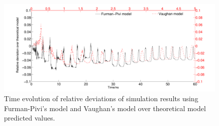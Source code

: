 \documentclass[a4paper,11pt]{article}
\begin{document}
\begin{figure}[H]
\begin{center}
\includegraphics[width=1\textwidth]{models_comp.pdf}
\end{center}
\caption{Time evolution of relative deviations of simulation results using Furman-Pivi's model and Vaughan's model over theoretical model predicted values.\label{fig:de}}
\end{figure}
\end{document}
